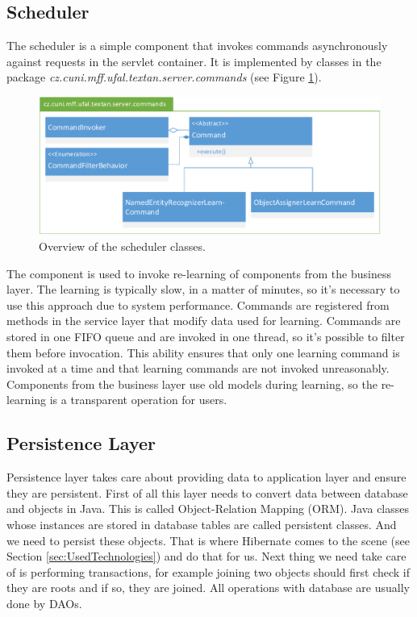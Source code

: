 \subsection{Scheduler}
The scheduler is a simple component that invokes commands asynchronously against
requests in the servlet container. It is implemented by classes in the package
\emph{cz.\-cuni.\-mff.\-ufal.\-textan.\-server.\-commands} (see Figure
\ref{fig:CommandsOverview}).

\begin{figure}[!htb]
        \centering
        \includegraphics[width=\textwidth]{Images/Commands}
        \caption{Overview of the scheduler classes.}
        \label{fig:CommandsOverview}
\end{figure}

The component is used to invoke re-learning of components from the business
layer. The learning is typically slow, in a matter of minutes, so it's necessary
to use this approach due to system performance. Commands are registered from
methods in the service layer that modify data used for learning. Commands are
stored in one FIFO queue and are invoked in one thread, so it's possible to
filter them before invocation. This ability ensures that only one learning
command is invoked at a time and that learning commands are not invoked
unreasonably. Components from the business layer use old models during learning,
so the re-learning is a transparent operation for users.

\subsection{Persistence Layer}
\label{sec:PersistentLayer}


Persistence layer takes care about providing data to application layer and
ensure they are persistent. First of all this layer needs to convert data
between database and objects in Java. This is called Object-Relation Mapping
(ORM). Java classes whose instances are stored in database tables are called
persistent classes. And we need to persist these objects. That is where
Hibernate comes to the scene (see Section \ref{sec:UsedTechnologies}) and do
that for us. Next thing we need take care of is performing transactions, for
example joining two objects should first check if they are roots and if so, they
are joined. All operations with database are usually done by DAOs.

